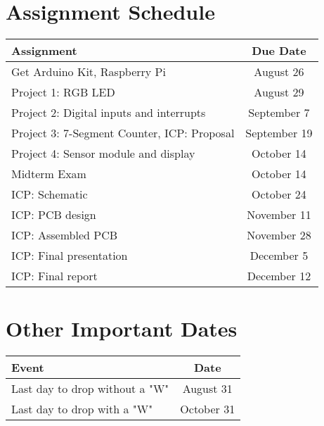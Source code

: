 \pagebreak

\section*{Assignment Schedule} 
\begin{table*}[h!]
    \begin{tabular}{ l | c }
        \toprule
        Assignment & Due Date \\

        \midrule
        Get Arduino Kit, Raspberry Pi\footnotemark                  & August 26     \\
        Project 1: RGB LED                                          & August 29     \\
        Project 2: Digital inputs and interrupts                    & September 7   \\
        Project 3: 7-Segment Counter, ICP: Proposal\footnotemark[2] & September 19  \\
        Project 4: Sensor module and display                        & October 14     \\
        Midterm Exam                                                & October 14    \\
        ICP: Schematic                                              & October 24    \\
        ICP: PCB design                                             & November 11   \\
        ICP: Assembled PCB                                          & November 28   \\
        ICP: Final presentation                                     & December 5    \\
        ICP: Final report                                           & December 12   \\

        \bottomrule
    \end{tabular}
\end{table*}

\section*{Other Important Dates}

\begin{table*}[h!]
    \begin{tabular}{ l | c }
        \toprule
        Event & Date \\

        \midrule
        Last day to drop without a "W"  & August 31 \\
        Last day to drop with a "W"     & October 31 \\

        \bottomrule
    \end{tabular}
\end{table*}

